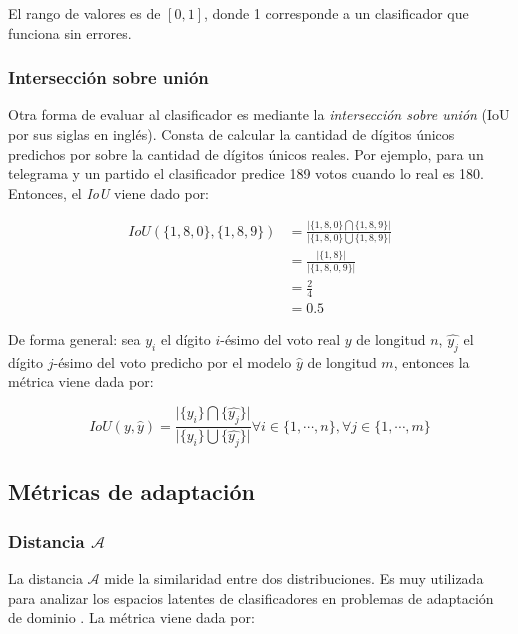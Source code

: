 \noindent
El rango de valores es de $[0, 1]$, donde 1 corresponde a un clasificador que funciona sin errores.

\subsubsection{Intersección sobre unión}

Otra forma de evaluar al clasificador es mediante la {\it intersección sobre unión} (IoU por sus siglas en inglés).
Consta de calcular la cantidad de dígitos únicos predichos por sobre la cantidad de dígitos únicos reales. Por ejemplo,
para un telegrama y un partido el clasificador predice 189 votos cuando lo real es 180. Entonces, el {\it IoU} viene
dado por:

\begin{align}
    IoU(\{1, 8, 0\}, \{1, 8, 9\}) & = \frac{\lvert\{1, 8, 0\} \bigcap \{1, 8, 9\}\rvert}{\lvert\{1, 8, 0\} \bigcup \{1, 8, 9\}\rvert} \nonumber \\
                                  & = \frac{\lvert\{1, 8\}\rvert}{\lvert\{1, 8, 0, 9\}\rvert}                                         \nonumber \\
                                  & = \frac{2}{4}                                                                     \nonumber                 \\
                                  & = 0.5
\end{align}

\noindent
De forma general: sea $y_{i}$ el dígito $i$-ésimo del voto real $y$ de longitud $n$, $\hat{y_{j}}$ el dígito $j$-ésimo
del voto predicho por el modelo $\hat{y}$ de longitud $m$, entonces la métrica viene dada por:

\begin{equation}
    IoU(y, \hat{y}) = \frac{\lvert \{y_{i}\} \bigcap \{\hat{y_{j}}\}\rvert}{\lvert \{y_{i}\} \bigcup \{\hat{y_{j}}\}\rvert} \forall i \in \{1, \cdots, n\}, \forall j \in \{1, \cdots, m\}
\end{equation}

\subsection{Métricas de adaptación}
\subsubsection{Distancia $\mathcal{A}$}

La distancia $\mathcal{A}$ mide la similaridad entre dos distribuciones. Es muy utilizada para analizar los espacios
latentes de clasificadores en problemas de adaptación de dominio \parencite{ben2006analysis}. La métrica viene dada por:

